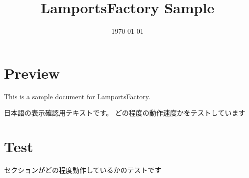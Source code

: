 \documentclass{ltjsarticle}
\title{LamportsFactory Sample}
\author{}
\date{\today}
\begin{document}
\maketitle

\section{Preview}

This is a sample document for LamportsFactory.

日本語の表示確認用テキストです。
どの程度の動作速度かをテストしています

\section{Test}

セクションがどの程度動作しているかのテストです
\end{document}
